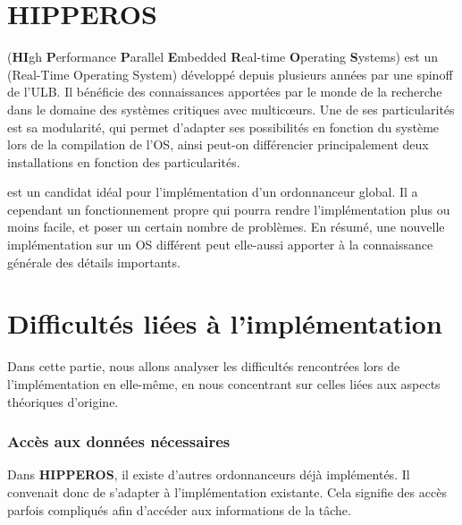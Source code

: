 		
\section{HIPPEROS}
	 (\textbf{HI}gh \textbf{P}erformance \textbf{P}arallel \textbf{E}mbedded \textbf{R}eal-time \textbf{O}perating \textbf{S}ystems)
	est un  (Real-Time Operating System) développé depuis plusieurs années par une spinoff de l'ULB.
	Il bénéficie des connaissances apportées par le monde de la recherche dans 
	le domaine des systèmes critiques avec multic\oe{}urs. Une de ses particularités 
	est sa modularité, qui permet d'adapter ses possibilités en fonction du système 
	lors de la compilation de l'OS, ainsi peut-on différencier principalement 
	deux installations en fonction des particularités. 
	
	 est un candidat idéal pour l'implémentation d'un ordonnanceur 
	global. Il a cependant un fonctionnement propre qui pourra rendre l'implémentation 
	plus ou moins facile, et poser un certain nombre de problèmes. 
	En résumé, une nouvelle implémentation sur un OS différent 
	peut elle-aussi apporter à la connaissance générale des détails importants.
		

\section{Difficultés liées à l'implémentation}

	Dans cette partie, nous allons analyser les difficultés rencontrées lors de l'implémentation en elle-même, 
	en nous concentrant sur celles liées aux aspects théoriques d'origine. 

	\subsubsection{Accès aux données nécessaires}
	
		Dans \textbf{HIPPEROS}, il existe d'autres ordonnanceurs déjà implémentés. Il convenait donc 
		de s'adapter à l'implémentation existante. Cela signifie des accès parfois compliqués afin d'accéder 
		aux informations de la tâche.\newline
		
